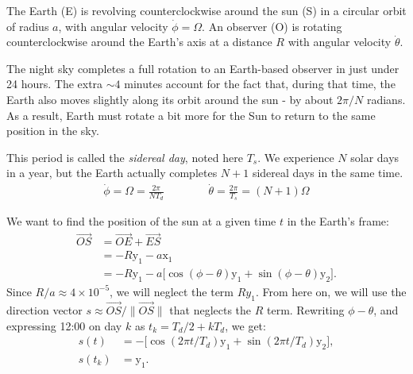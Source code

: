 \documentclass[12pt]{article}
\begin{document}
The Earth (E) is revolving counterclockwise around the sun (S) in a circular 
orbit of radius $a$, with angular velocity $\dot \phi=\Omega$.
An observer (O) is rotating counterclockwise around the Earth's axis at a 
distance $R$ with angular velocity $\dot \theta$.

The night sky completes a full rotation to an Earth-based observer in just 
under 24 hours. The extra $\sim 4$ minutes account for the fact that, during 
that time, the Earth also moves slightly along its orbit around the sun - by
about $2\pi/N$ radians. As a result, Earth must rotate a bit more for the 
Sun to return to the same position in the sky.

This period is called the \textit{sidereal day}, noted here $T_s$. 
We experience $N$ solar days in a year, but the Earth actually completes $N+1$ 
sidereal days in the same time.
\begin{align}
    \dot\phi = \Omega = \frac{2\pi}{N T_d} \qquad\qquad
    \dot\theta = \frac{2\pi}{T_s} = (N+1) \Omega
\end{align}

We want to find the position of the sun at a given time $t$ in the Earth's 
frame:
\begin{equation}
    \begin{aligned}
        \overrightarrow{OS} &= \overrightarrow{OE} + \overrightarrow{ES}\\
        &= -R \mathrm{y}_1 - a \mathrm{x}_1\\
        &= -R \mathrm{y}_1 - a \Big[\cos(\phi-\theta) \mathrm{y}_1 + \sin(\phi-\theta) \mathrm{y}_2\Big].
    \end{aligned}
\end{equation}
Since $R/a \approx 4\times 10^{-5}$, we will neglect the term $R y_1$.
From here on, we will use the direction vector 
$s\approx \overrightarrow{OS}/\|\overrightarrow{OS}\|$ that neglects
the $R$ term. Rewriting $\phi-\theta$, and expressing 12:00 on day $k$ 
as $t_{k}=T_d/2 + kT_d$, we get:
\begin{align}
    s(t) &= -\Big[\cos(2\pi t/T_d) \mathrm{y}_1 + \sin(2\pi t/T_d) \mathrm{y}_2\Big],\\
    s(t_{k}) &= \mathrm{y}_1.
\end{align}
\end{document}
